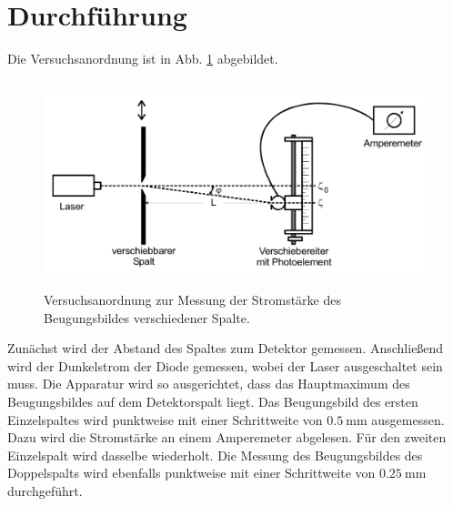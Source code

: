 \section{Durchführung}
\label{sec:Durchführung}
Die Versuchsanordnung ist in Abb. \ref{fig:Anordnung} abgebildet.
\begin{figure}
    \centering
    \includegraphics[width=12cm, height=6cm]{build/Anordnung.png}
    \caption{Versuchsanordnung zur Messung der Stromstärke des
    Beugungsbildes verschiedener Spalte. \cite{V406}}
    \label{fig:Anordnung}
\end{figure}

\noindent Zunächst wird der Abstand des Spaltes zum Detektor gemessen.
Anschließend wird der Dunkelstrom der Diode gemessen, wobei
der Laser ausgeschaltet sein muss.
\newline
Die Apparatur wird so ausgerichtet, dass das Hauptmaximum des 
Beugungsbildes auf dem Detektorspalt liegt.
\newline
Das Beugungsbild des ersten Einzelspaltes wird punktweise
mit einer Schrittweite von $\SI{0.5}{\milli\meter}$ ausgemessen.
Dazu wird die Stromstärke an einem Amperemeter abgelesen.
\newline
Für den zweiten Einzelspalt wird dasselbe wiederholt.
\newline
Die Messung des Beugungsbildes des Doppelspalts wird ebenfalls
punktweise mit einer Schrittweite von $\SI{0.25}{\milli\meter}$ 
durchgeführt.
